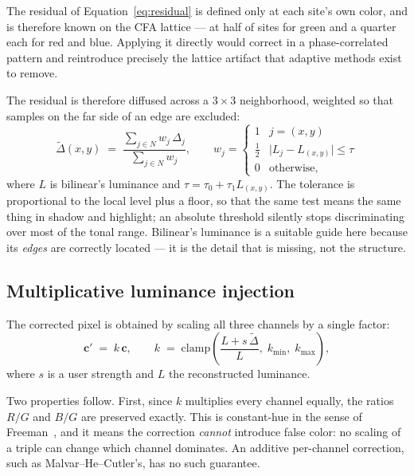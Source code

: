 \documentclass[10pt,a4paper]{article}
\begin{document}
The residual of Equation~\ref{eq:residual} is defined only at each site's own
color, and is therefore known on the CFA lattice --- at half of sites for
green and a quarter each for red and blue. Applying it directly would correct
in a phase-correlated pattern and reintroduce precisely the lattice artifact
that adaptive methods exist to remove.

The residual is therefore diffused across a $3\times3$ neighborhood, weighted
so that samples on the far side of an edge are excluded:
%
\begin{equation}
\tilde{\Delta}(x,y) \;=\;
  \frac{\sum_{j \in N} w_j\, \Delta_j}{\sum_{j \in N} w_j},
  \qquad
  w_j = \begin{cases}
    1 & j = (x,y)\\
    \tfrac{1}{2} & \lvert L_j - L_{(x,y)}\rvert \le \tau\\
    0 & \text{otherwise,}
  \end{cases}
\end{equation}
%
where $L$ is bilinear's luminance and $\tau = \tau_0 + \tau_1 L_{(x,y)}$. The
tolerance is proportional to the local level plus a floor, so that the same
test means the same thing in shadow and highlight; an absolute threshold
silently stops discriminating over most of the tonal range. Bilinear's
luminance is a suitable guide here because its \emph{edges} are correctly
located --- it is the detail that is missing, not the structure.

\subsection{Multiplicative luminance injection}
\label{sec:inject}

The corrected pixel is obtained by scaling all three channels by a single
factor:
%
\begin{equation}
\mathbf{c}' \;=\; k\,\mathbf{c},
\qquad
k \;=\; \mathrm{clamp}\!\left(\frac{L + s\,\tilde{\Delta}}{L},\; k_{\min},\; k_{\max}\right),
\label{eq:inject}
\end{equation}
%
where $s$ is a user strength and $L$ the reconstructed luminance.

Two properties follow. First, since $k$ multiplies every channel equally, the
ratios $R/G$ and $B/G$ are preserved exactly. This is constant-hue in the sense
of Freeman~\cite{freeman1988patent}, and it means the correction
\emph{cannot} introduce false color: no scaling of a triple can change which
channel dominates. An additive per-channel correction, such as
Malvar--He--Cutler's, has no such guarantee.
\end{document}
